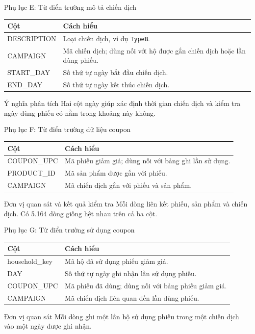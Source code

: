 \documentclass[smaller,aspectratio=169,t]{beamer}
\newcommand{\toprule}{\hline}
\newcommand{\midrule}{\hline}
\newcommand{\bottomrule}{\hline}}
\begin{document}
\begin{frame}{Phụ lục E: Từ điển trường mô tả chiến dịch}
\small\renewcommand{\arraystretch}{1.25}
\begin{tabularx}{\textwidth}{>{\ttfamily}p{3.5cm}X}
\toprule Cột & Cách hiểu \\
\midrule
DESCRIPTION & Loại chiến dịch, ví dụ \texttt{TypeB}. \\
CAMPAIGN & Mã chiến dịch; dùng nối với hộ được gắn chiến dịch hoặc lần dùng phiếu. \\
START\_DAY & Số thứ tự ngày bắt đầu chiến dịch. \\
END\_DAY & Số thứ tự ngày kết thúc chiến dịch. \\
\bottomrule
\end{tabularx}
\vspace{5mm}\begin{block}{Ý nghĩa phân tích}
Hai cột ngày giúp xác định thời gian chiến dịch và kiểm tra ngày dùng phiếu có nằm trong khoảng này không.
\end{block}
\end{frame}

\begin{frame}{Phụ lục F: Từ điển trường dữ liệu coupon}
\small\renewcommand{\arraystretch}{1.3}
\begin{tabularx}{\textwidth}{>{\ttfamily}p{3.5cm}X}
\toprule Cột & Cách hiểu \\
\midrule
COUPON\_UPC & Mã phiếu giảm giá; dùng nối với bảng ghi lần sử dụng. \\
PRODUCT\_ID & Mã sản phẩm được gắn với phiếu. \\
CAMPAIGN & Mã chiến dịch gắn với phiếu và sản phẩm. \\
\bottomrule
\end{tabularx}
\vspace{5mm}\begin{block}{Đơn vị quan sát và kết quả kiểm tra}
Mỗi dòng liên kết phiếu, sản phẩm và chiến dịch. Có 5.164 dòng giống hệt nhau trên cả ba cột.
\end{block}
\end{frame}

\begin{frame}{Phụ lục G: Từ điển trường sử dụng coupon}
\small\renewcommand{\arraystretch}{1.25}
\begin{tabularx}{\textwidth}{>{\ttfamily}p{3.5cm}X}
\toprule Cột & Cách hiểu \\
\midrule
household\_key & Mã hộ đã sử dụng phiếu giảm giá. \\
DAY & Số thứ tự ngày ghi nhận lần sử dụng phiếu. \\
COUPON\_UPC & Mã phiếu đã dùng; dùng nối với bảng phiếu giảm giá. \\
CAMPAIGN & Mã chiến dịch liên quan đến lần dùng phiếu. \\
\bottomrule
\end{tabularx}
\vspace{5mm}\begin{block}{Đơn vị quan sát}
Mỗi dòng ghi một lần hộ sử dụng phiếu trong một chiến dịch vào một ngày được ghi nhận.
\end{block}
\end{frame}
\end{document}

